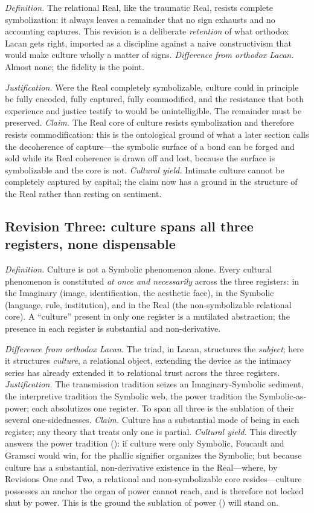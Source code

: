 \emph{Definition.} The relational Real, like the traumatic Real, resists complete symbolization: it always leaves a remainder that no sign exhausts and no accounting captures. This revision is a deliberate \emph{retention} of what orthodox Lacan gets right, imported as a discipline against a naive constructivism that would make culture wholly a matter of signs. \emph{Difference from orthodox Lacan.} Almost none; the fidelity is the point.

\emph{Justification.} Were the Real completely symbolizable, culture could in principle be fully encoded, fully captured, fully commodified, and the resistance that both experience and justice testify to would be unintelligible. The remainder must be preserved. \emph{Claim.} The Real core of culture resists symbolization and therefore resists commodification: this is the ontological ground of what a later section calls the decoherence of capture---the symbolic surface of a bond can be forged and sold while its Real coherence is drawn off and lost, because the surface is symbolizable and the core is not. \emph{Cultural yield.} Intimate culture cannot be completely captured by capital; the claim now has a ground in the structure of the Real rather than resting on sentiment.

\subsection*{Revision Three: culture spans all three registers, none dispensable}

\emph{Definition.} Culture is not a Symbolic phenomenon alone. Every cultural phenomenon is constituted \emph{at once and necessarily} across the three registers: in the Imaginary (image, identification, the aesthetic face), in the Symbolic (language, rule, institution), and in the Real (the non-symbolizable relational core). A ``culture'' present in only one register is a mutilated abstraction; the presence in each register is substantial and non-derivative.

\emph{Difference from orthodox Lacan.} The triad, in Lacan, structures the \emph{subject}; here it structures \emph{culture}, a relational object, extending the device as the intimacy series has already extended it to relational trust across the three registers. \emph{Justification.} The transmission tradition seizes an Imaginary-Symbolic sediment, the interpretive tradition the Symbolic web, the power tradition the Symbolic-as-power; each absolutizes one register. To span all three is the sublation of their several one-sidednesses. \emph{Claim.} Culture has a substantial mode of being in each register; any theory that treats only one is partial. \emph{Cultural yield.} This directly answers the power tradition (): if culture were only Symbolic, Foucault and Gramsci would win, for the phallic signifier organizes the Symbolic; but because culture has a substantial, non-derivative existence in the Real---where, by Revisions One and Two, a relational and non-symbolizable core resides---culture possesses an anchor the organ of power cannot reach, and is therefore not locked shut by power. This is the ground the sublation of power () will stand on.

